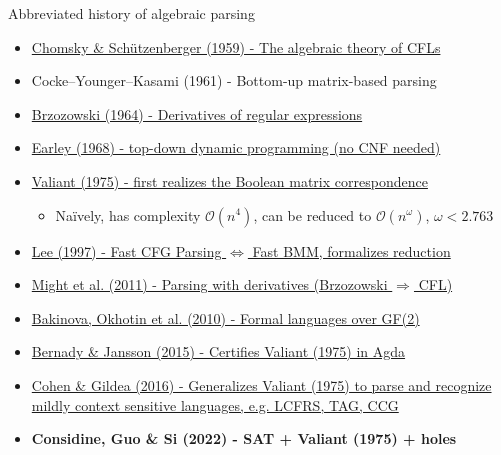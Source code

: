 \documentclass{beamer}
\begin{document}
\begin{frame}{Abbreviated history of algebraic parsing}
  \begin{itemize}
    \item \href{http://www-igm.univ-mlv.fr/~berstel/Mps/Travaux/A/1963-7ChomskyAlgebraic.pdf}{Chomsky \& Sch\"utzenberger (1959) - The algebraic theory of CFLs}
    \item Cocke–Younger–Kasami (1961) - Bottom-up matrix-based parsing
    \item \href{https://dl.acm.org/doi/10.1145/321239.321249}{Brzozowski (1964) - Derivatives of regular expressions}
    \item \href{https://dl.acm.org/doi/10.1145/362007.362035}{Earley (1968) - top-down dynamic programming (no CNF needed)}
    \item \href{http://theory.stanford.edu/~virgi/cs367/papers/valiantcfg.pdf}{Valiant (1975) - first realizes the Boolean matrix correspondence}
    \begin{itemize}
      \item Na\"ively, has complexity $\mathcal{O}(n^4)$, can be reduced to $\mathcal{O}(n^\omega)$, $\omega < 2.763$
    \end{itemize}
    \item \href{https://www.cs.cornell.edu/home/llee/papers/bmmcfl-jacm.pdf}{Lee (1997) - Fast CFG Parsing $\Longleftrightarrow$ Fast BMM, formalizes reduction}
    \item \href{https://matt.might.net/papers/might2011derivatives.pdf}{Might et al. (2011) - Parsing with derivatives (Brzozowski $\Rightarrow$ CFL)}
    \item \href{https://users.math-cs.spbu.ru/~okhotin/papers/formal_languages_gf2.pdf}{Bakinova, Okhotin et al. (2010) - Formal languages over GF(2)}
    \item \href{https://arxiv.org/pdf/1601.07724.pdf}{Bernady \& Jansson (2015) - Certifies Valiant (1975) in Agda}
    \item \href{https://arxiv.org/pdf/1504.08342.pdf}{Cohen \& Gildea (2016) - Generalizes Valiant (1975) to parse and recognize mildly context sensitive languages, e.g. LCFRS, TAG, CCG}
    \item \textbf{Considine, Guo \& Si (2022) - SAT + Valiant (1975) + holes}
  \end{itemize}
\end{frame}
\end{document}
